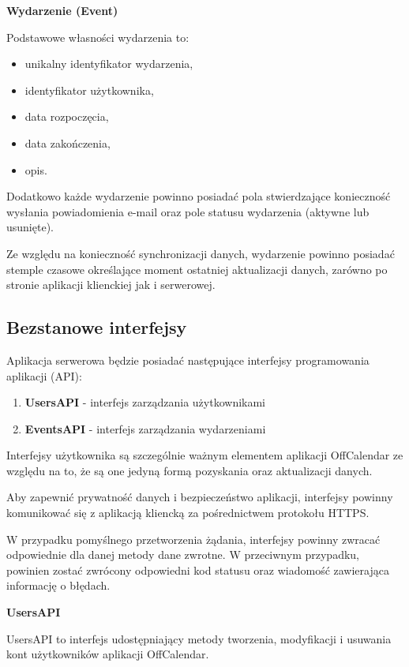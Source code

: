 \textbf{Wydarzenie (Event)}

Podstawowe własności wydarzenia to:

\begin{itemize}
\item unikalny identyfikator wydarzenia,
\item identyfikator użytkownika,
\item data rozpoczęcia,
\item data zakończenia,
\item opis.
\end{itemize}

Dodatkowo każde wydarzenie powinno posiadać pola stwierdzające konieczność wysłania powiadomienia e-mail oraz pole statusu wydarzenia (aktywne lub usunięte). 

Ze względu na konieczność synchronizacji danych, wydarzenie powinno posiadać stemple czasowe określające moment ostatniej aktualizacji danych, zarówno po stronie aplikacji klienckiej jak i serwerowej.

\subsection{Bezstanowe interfejsy}
\label{bezstanoweInter}

Aplikacja serwerowa będzie posiadać następujące interfejsy programowania aplikacji (API):

\begin{enumerate}
\item \textbf{UsersAPI} - interfejs zarządzania użytkownikami
\item \textbf{EventsAPI} - interfejs zarządzania wydarzeniami
\end{enumerate}

Interfejsy użytkownika są szczególnie ważnym elementem aplikacji OffCalendar ze względu na to, że są one jedyną formą pozyskania oraz aktualizacji danych. 

Aby zapewnić prywatność danych i bezpieczeństwo aplikacji, interfejsy powinny komunikować się z aplikacją kliencką za pośrednictwem protokołu HTTPS.

W przypadku pomyślnego przetworzenia żądania, interfejsy powinny zwracać odpowiednie dla danej metody dane zwrotne. W przeciwnym przypadku, powinien zostać zwrócony odpowiedni kod statusu oraz wiadomość zawierająca informację o błędach.

\textbf{UsersAPI}

UsersAPI to interfejs udostępniający metody tworzenia, modyfikacji i usuwania kont użytkowników aplikacji OffCalendar.

